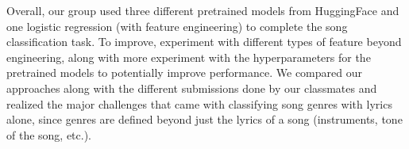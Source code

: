 Overall, our group used three different pretrained models from HuggingFace and one logistic regression (with feature engineering) to complete the song classification task. To improve, experiment with different types of feature beyond engineering, along with more experiment with the hyperparameters for the pretrained models to potentially improve performance. We compared our approaches along with the different submissions done by our classmates and realized the major challenges that came with classifying song genres with lyrics alone, since genres are defined beyond just the lyrics of a song (instruments, tone of the song, etc.). 